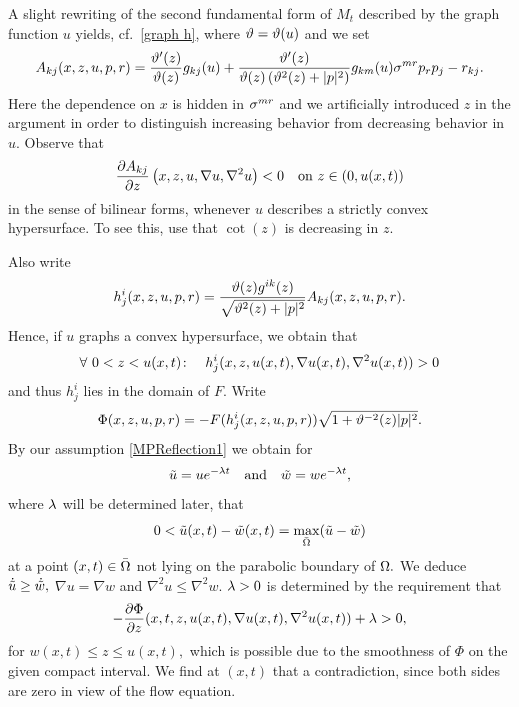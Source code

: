 \documentclass{amsart}
\begin{document}
{A slight rewriting of the second fundamental form of $M_t$ described by the graph function $u$ yields, cf.~\eqref{graph h},
 where $\vt=\vt(u)$ and we set
 $$A_{kj}(x,z,u,p,r)=\fr{\vt'(z)}{\vt(z)}g_{kj}(u)+\fr{\vt'(z)}{\vt(z)\br{\vt^2(z)+|p|^2}}g_{km}(u)\s^{mr}p_rp_j-r_{kj}.$$
 Here the dependence on $x$ is hidden in $\s^{mr}$ and we artificially introduced $z$ in the argument in order to distinguish increasing behavior from decreasing behavior in $u.$ Observe that
 $$\fr{\del A_{kj}}{\del z}\br{x,z,u,\nabla u,\nabla^2u}<0\quad\text{on}~ z\in(0,u(x,t))$$
 in the sense of bilinear forms, whenever $u$ describes a strictly convex hypersurface. To see this, use that $\cot(z)$ is decreasing in $z.$

Also write
$$h^i_j(x,z,u,p,r)=\fr{\vt(z)g^{ik}(z)}{\sqrt{\vt^2(z)+|p|^2}}A_{kj}(x,z,u,p,r).$$
Hence, if $u$ graphs a convex hypersurface, we obtain that
$$\forall~ 0<z< u(x,t)\cn\quad h^i_j(x,z,u(x,t),\nabla u(x,t),\nabla^2u(x,t))>0$$
 and thus $h^i_j$ lies in the domain of $F.$ Write
  $$\Phi(x,z,u,p,r)=-F(h^i_j(x,z,u,p,r))\sqrt{1+\vt^{-2}(z)|p|^2}.$$
By our assumption \eqref{MPReflection1} we obtain for 
 $$\~u=ue^{-\l t}\quad\text{and}\quad \~w=we^{-\l t},$$
 where $\l$ will be determined later, that
 $$0<\~u(x,t)-\~w(x,t)=\max_{\-\O}(\~u-\~w)$$
 at a point $(x,t)\in\-\O$ not lying on the parabolic boundary of $\O.$ We deduce $\dot{\~u}\geq \dot{\~w},$ $\nabla u=\nabla w$ and $\nabla^2u\leq \nabla^2w.$ 
$\l>0$ is determined by the requirement that
$$-\fr{\del\Phi}{\del z}(x,t,z,u(x,t),\nabla u(x,t),\nabla^2 u(x,t))+\l>0,
$$
for $w(x,t)\leq z\leq u(x,t),$ which is possible due to the smoothness of $\Phi$ on the given compact interval. We find at $(x,t)$ that
 a contradiction, since both sides are zero in view of the flow equation.
}
\end{document}
